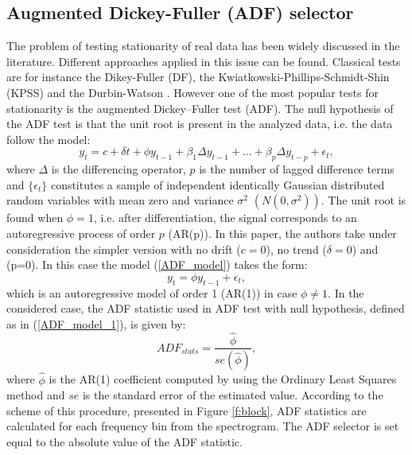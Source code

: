 \documentclass[11pt]{article}
\begin{document}
\subsection{Augmented Dickey-Fuller (ADF) selector}
The problem of testing stationarity of real data has been widely discussed in the literature. Different approaches applied in this issue can be found. Classical tests are for instance the Dikey-Fuller (DF), the Kwiatkowski-Phillips-Schmidt-Shin (KPSS) and the Durbin-Watson 
\cite{dickey1979distribution,kwiatkowski1992testing,durbin1951testing}. However one of the most popular tests for stationarity is the augmented Dickey–Fuller test (ADF). The null hypothesis of the ADF test is that the unit root is present in the analyzed data, i.e. the data follow the model:
\begin{equation}
    \label{ADF_model}
    y_t=c+\delta t + \phi y_{t-1} + \beta _1 \Delta y_{t-1} + \dots +  \beta _p \Delta y_{t-p} + \epsilon _t,
\end{equation}
where $\Delta$ is the differencing operator, $p$ is the number of lagged difference terms and $
\{\epsilon _t\}$ constitutes a sample of independent identically Gaussian distributed random variables with mean zero and variance $\sigma^2$ $ \left( N(0,\sigma^2) \right) $. The unit root is found when $\phi=1$, i.e. after differentiation, the signal corresponds to an autoregressive process of order $p$ (AR(p)).
In this paper, the authors take under consideration the simpler version with no drift ($c=0$), no trend ($\delta=0$) and (p=0). In this case the model (\ref{ADF_model}) takes the form:
\begin{equation}
    \label{ADF_model_1}
    y_t=\phi y_{t-1} + \epsilon _t,
\end{equation}
which is  an autoregressive model of order 1 (AR(1)) in case $\phi \neq 1$.  In the considered case, the ADF statistic used in ADF test with null hypothesis, defined as in (\ref{ADF_model_1}), is given by:
\begin{equation}
    \label{ADF_stats}
  ADF_{stats}= \frac{ \hat{\phi} }{ se(\hat{\phi}) },
\end{equation}
where $\hat{\phi}$ is the AR(1) coefficient computed by using the Ordinary Least Squares method and $se$ is the standard error of the estimated value. According to the scheme of this procedure, presented in Figure \ref{f:block}, ADF statistics are calculated for each frequency bin from the spectrogram. The ADF selector is set equal to the absolute value of the ADF statistic. 
\end{document}
